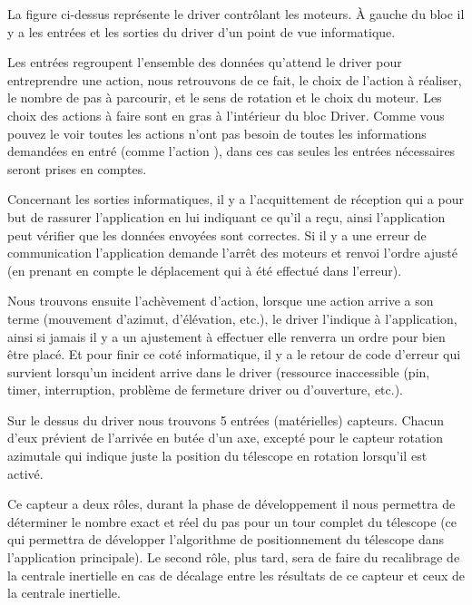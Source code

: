 La figure ci-dessus représente le driver contrôlant les moteurs. À gauche du bloc il y a les entrées et les sorties du driver d'un point de vue informatique.

\vspace{1cm}

Les entrées regroupent l'ensemble des données qu'attend le driver pour entreprendre une action, nous retrouvons de ce fait, le choix de l'action à réaliser, le nombre de pas à parcourir, et le sens de rotation et le choix du moteur. Les choix des actions à faire sont en gras à l'intérieur du bloc Driver. Comme vous pouvez le voir toutes les actions n'ont pas besoin de toutes les informations demandées en entré (comme l'action ), dans ces cas seules les entrées nécessaires seront prises en comptes.

\vspace{1cm}

Concernant les sorties informatiques, il y a l'acquittement de réception qui a pour but de rassurer l'application en lui indiquant ce qu'il a reçu, ainsi l'application peut vérifier que les données envoyées sont correctes. Si il y a une erreur de communication l'application demande l'arrêt des moteurs et renvoi l'ordre ajusté (en prenant en compte le déplacement qui à été effectué dans l'erreur).


Nous trouvons ensuite l'achèvement d'action, lorsque une action arrive a son terme (mouvement d'azimut, d'élévation, etc.), le driver l'indique à l'application, ainsi si jamais il y a un ajustement à effectuer elle renverra un ordre pour bien être placé. Et pour finir ce coté informatique, il y a le retour de code d'erreur qui survient lorsqu'un incident arrive dans le driver (ressource inaccessible (pin, timer, interruption, problème de fermeture driver ou d'ouverture, etc.).

\vspace{1cm}

Sur le dessus du driver nous trouvons 5 entrées (matérielles) capteurs. Chacun d'eux prévient de l'arrivée en butée d'un axe, excepté pour le capteur rotation azimutale qui indique juste la position du télescope en rotation lorsqu'il est activé.

Ce capteur a deux rôles, durant la phase de développement il nous permettra de déterminer le nombre exact et réel du pas pour un tour complet du télescope (ce qui permettra de développer l'algorithme de positionnement du télescope dans l'application principale). Le second rôle, plus tard, sera de faire du recalibrage de la centrale inertielle en cas de décalage entre les résultats de ce capteur et ceux de la centrale inertielle.

